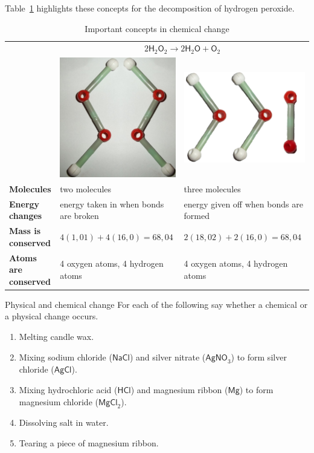 Table~\ref{tab:chemchangeconcepts} highlights these concepts for the decomposition of hydrogen peroxide.
\begin{table}[H]
 \begin{center}
  \begin{tabular}{|l|l|l|} \hline
& \multicolumn{2}{|c|}{$2\mathsf{H}_{2}\mathsf{O}_{2} \rightarrow 2\mathsf{H}_{2}\mathsf{O} + \mathsf{O}_{2}$} \\ 
& \includegraphics[width=.1\textwidth]{photos/H2O2_models.png} & \includegraphics[width=.1\textwidth]{photos/H2O_O2.png} \\ \hline
   \textbf{Molecules} & two molecules & three molecules \\ \hline
\textbf{Energy changes} & energy taken in when bonds are broken & energy given off when bonds are formed \\ \hline
\textbf{Mass is conserved} & $4(1,01) + 4(16,0) = 68,04$ & $2(18,02) + 2(16,0) = 68,04$ \\ \hline
\textbf{Atoms are conserved} & 4 oxygen atoms, 4 hydrogen atoms & 4 oxygen atoms, 4 hydrogen atoms \\ \hline
  \end{tabular}
 \end{center}
\caption{Important concepts in chemical change}
\label{tab:chemchangeconcepts}
\end{table}
\begin{exercises}{Physical and chemical change}
 For each of the following say whether a chemical or a physical change occurs.
\begin{enumerate}[noitemsep, label=\textbf{\arabic*}. ]
\item Melting candle wax.
\item Mixing sodium chloride ($\mathsf{NaCl}$) and silver nitrate ($\mathsf{AgNO}_3$) to form silver chloride ($\mathsf{AgCl}$).
\item Mixing hydrochloric acid ($\mathsf{HCl}$) and magnesium ribbon ($\mathsf{Mg}$) to form magnesium chloride ($\mathsf{MgCl}_{2}$).
\item Dissolving salt in water.
\item Tearing a piece of magnesium ribbon. 
\end{enumerate}

\end{exercises}

